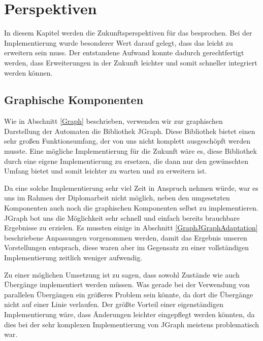 

\chapter{Perspektiven}\label{Perspective}

In diesem Kapitel werden die Zukunftsperspektiven für das \gtitool besprochen.
Bei der Implementierung wurde besonderer Wert darauf gelegt, dass das \gtitool
leicht zu erweitern sein muss. Der entstandene Aufwand konnte dadurch
gerechtfertigt werden, dass Erweiterungen in der Zukunft leichter und somit
schneller integriert werden können.\vspace{10pt}


\section{Graphische Komponenten}\label{PerspectiveGraphics}

Wie in Abschnitt \ref{Graph} beschrieben, verwenden wir zur graphischen
Darstellung der Automaten die Bibliothek JGraph. Diese Bibliothek bietet einen
sehr großen Funktionsumfang, der von uns nicht komplett ausgeschöpft werden
musste. Eine mögliche Implementierung für die Zukunft wäre es, diese Bibliothek
durch eine eigene Implementierung zu ersetzen, die dann nur den gewünschten
Umfang bietet und somit leichter zu warten und zu erweitern ist.\vspace{10pt}

Da eine solche Implementierung sehr viel Zeit in Anspruch nehmen würde, war es
uns im Rahmen der Diplomarbeit nicht möglich, neben den umgesetzten Komponenten
auch noch die graphischen Komponenten selbst zu implementieren. JGraph bot uns
die Möglichkeit sehr schnell und einfach bereits brauchbare Ergebnisse zu
erzielen. Es mussten einige in Abschnitt \ref{GraphJGraphAdaptation} beschriebene
Anpassungen vorgenommen werden, damit das Ergebnis unseren Vorstellungen
entsprach, diese waren aber im Gegensatz zu einer vollständigen Implementierung
zeitlich weniger aufwendig.\vspace{10pt}

Zu einer möglichen Umsetzung ist zu sagen, dass sowohl Zustände wie auch
Übergänge implementiert werden müssen. Was gerade bei der Verwendung von
parallelen Übergängen ein größeres Problem sein könnte, da dort die Übergänge
nicht auf einer Linie verlaufen. Der größte Vorteil einer eigenständigen
Implementierung wäre, dass Änderungen leichter eingepflegt werden könnten, da
dies bei der sehr komplexen Implementierung von JGraph meistens problematisch
war.\vspace{10pt}

